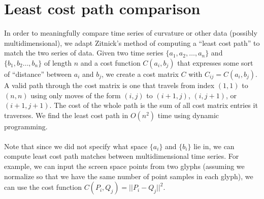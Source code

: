 \documentclass[journal]{IEEEtran}
\begin{document}
\section{Least cost path comparison}
In order to meaningfully compare time series of curvature or other data (possibly multidimensional), we adapt Zitnick's method of computing a ``least cost path'' to match the two series of data. Given two time series $\{a_1,a_2,\ldots,a_n\}$ and $\{b_1,b_2\ldots,b_n\}$ of length $n$ and a cost function $C(a_i,b_j)$ that expresses some sort of ``distance'' between $a_i$ and $b_j$, we create a cost matrix $C$ with $C_{ij}=C(a_i,b_j)$. A valid path through the cost matrix is one that travels from index $(1,1)$ to $(n,n)$ using only moves of the form $(i,j)$ to $(i+1,j)$, $(i,j+1)$, or $(i+1,j+1)$. The cost of the whole path is the sum of all cost matrix entries it traverses. We find the least cost path in $O(n^2)$ time using dynamic programming.\\\\
Note that since we did not specify what space $\{a_i\}$ and $\{b_i\}$ lie in, we can compute least cost path matches between multidimensional time series. For example, we can input the screen space points from two glyphs (assuming we normalize so that we have the same number of point samples in each glyph), we can use the cost function $C(P_i,Q_j) = ||P_i - Q_j||^2$.
\end{document}
